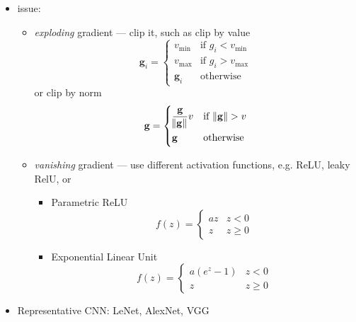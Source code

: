 \documentclass[twocolumn,landscape,10pt]{article}
\theoremstyle{definition}
\begin{document}
\begin{itemize}
\begin{itemize}
        \end{itemize} 
    \item issue:
        \begin{itemize}
            \item  \emph{exploding} gradient --- clip it, such as clip by value
                \[
                    \mathbf{g}_i=
                    \begin{cases}
                        v_\text{min} & \text{if }g_i<v_\text{min} \\
                        v_\text{max} & \text{if }g_i>v_\text{max} \\
                        \mathbf{g}_i & \text{otherwise}
                    \end{cases} 
                \]
                or clip by norm
                \[
                    \mathbf{g}=
                    \begin{dcases}
                        \frac{\mathbf{g}}{\norm{\mathbf{g}}}v & \text{if }
                        \norm{\mathbf{g}}>v \\
                        \mathbf{g} & \text{otherwise}
                    \end{dcases} 
                \]
            \item \emph{vanishing} gradient --- use different activation
                functions, e.g. ReLU, leaky RelU, or
                \begin{itemize}
                    \item Parametric ReLU
                        \[
                            f(z)=
                            \begin{cases}
                                az & z < 0 \\
                                z & z \ge 0
                            \end{cases} 
                        \]
                    \item Exponential Linear Unit
                        \[
                            f(z)=
                            \begin{cases}
                                a(e^z-1) & z < 0 \\
                                z & z \ge 0
                            \end{cases} 
                        \]
                \end{itemize} 
        \end{itemize}
    \item Representative CNN: LeNet, AlexNet, VGG
\end{itemize} 
\end{document}

